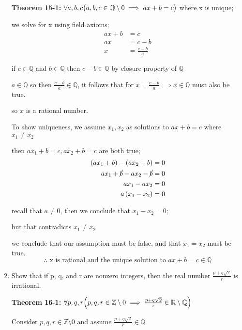 \documentclass{article}
\newcommand{\paren}[1]{\mathopen{}\left( {#1}_{{}_{}}\,\negthickspace\right)\mathclose{}} %
\begin{document}
\begin{enumerate}[start = 8, label = {\bfseries Problem \arabic*:}, leftmargin=1in]
    \textbf{Theorem 15-1:} \(\forall a, b, c \paren{a, b, c \in \mathbb{Q} \setminus 0 \implies ax + b = c}\) where x is unique;
    
    we solve for x using field axioms;
    \begin{align*}
        ax + b &= c \\
        ax &= c - b \\
        x &= \frac{c - b}{a} 
    \end{align*}

    if \(c \in \mathbb{Q}\) and \(b \in \mathbb{Q}\) then \(c - b \in \mathbb{Q}\) by closure property of \(\mathbb{Q}\)

    \(a \in \mathbb{Q}\) so then \(\frac{c - b}{a} \in \mathbb{Q}\), it follows that for \(x = \frac{c - b}{a} \implies x \in \mathbb{Q}\) must also be true.

    so \(x\) is a rational number.

    To show uniqueness, we assume \(x_1, x_2\) as solutions to \(ax + b = c\) where \(x_1 \neq x_2\)

    then \(ax_1 + b = c, ax_2 + b = c\) are both true;
    \begin{align*}
        \left(ax_1 + b\right) - \left(ax_2 + b\right) &= 0 \\
        ax_1 + \cancel{b} - ax_2 - \cancel{b} &= 0 \\ 
        ax_1 - ax_2 &= 0 \\
        a\left(x_1 - x_2\right) &= 0
    \end{align*}

    recall that \(a \neq 0\), then we conclude that \(x_1 - x_2 = 0\);

    but that contradicts \(x_1 \neq x_2\)
    
    we conclude that our assumption must be false, and that \(x_1 = x_2\) must be true.
    \[
        \therefore \text{ x is rational and the unique solution to } ax + b = c \in \mathbb{Q}
    \]

    \item Show that if p, q, and r are nonzero integers, then the real number \(\frac{p + q\sqrt{2}}{r}\) is irrational. 

    \textbf{Theorem 16-1:} \(\forall p, q, r\paren{p, q, r \in \mathbb{Z} \setminus 0 \implies \frac{p + q \sqrt{2}}{r} \in \mathbb{R \setminus Q}}\)
    
    Consider \(p, q, r \in \mathbb{Z}\setminus 0\) and assume \(\frac{p + q\sqrt{2}}{r} \in \mathbb{Q}\)


\end{enumerate}
\end{document}
